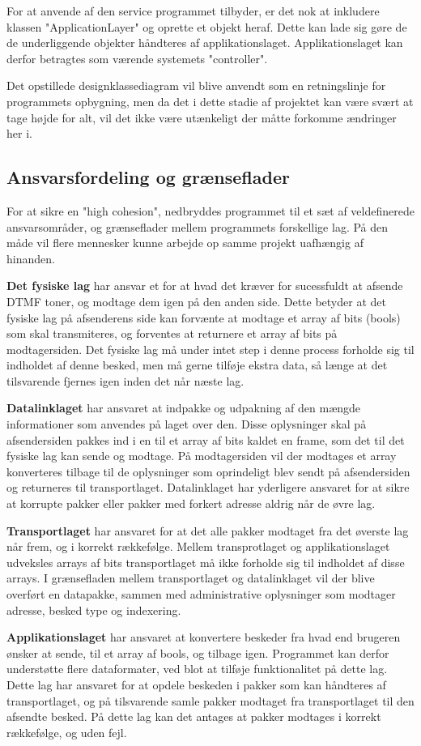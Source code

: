 For at anvende af den service programmet tilbyder, er det nok at inkludere klassen "ApplicationLayer" og oprette et objekt heraf. Dette kan lade sig gøre de de underliggende objekter håndteres af applikationslaget. Applikationslaget kan derfor betragtes som værende systemets "controller". 

Det opstillede designklassediagram vil blive anvendt som en retningslinje for programmets opbygning, men da det i dette stadie af projektet kan være svært at tage højde for alt, vil det ikke være utænkeligt der måtte forkomme ændringer her i.


\subsection{Ansvarsfordeling og grænseflader}
For at sikre en "high cohesion", nedbryddes programmet til et sæt af veldefinerede ansvarsområder, og grænseflader mellem programmets forskellige lag. På den måde vil flere mennesker kunne arbejde op samme projekt uafhængig af hinanden.  

\textbf{Det fysiske lag} har ansvar et for at hvad det kræver for sucessfuldt at afsende DTMF toner, og modtage dem igen på den anden side. Dette betyder at det fysiske lag på afsenderens side kan forvænte at modtage et array af bits (bools) som skal transmiteres, og forventes at returnere et array af bits på modtagersiden. Det fysiske lag må under intet step i denne process forholde sig til indholdet af denne besked, men må gerne tilføje ekstra data, så længe at det tilsvarende fjernes igen inden det når næste lag.

\textbf{Datalinklaget} har ansvaret at indpakke og udpakning af den mængde informationer som anvendes på laget over den. Disse oplysninger skal på afsendersiden pakkes ind i en til et array af bits kaldet en frame, som det til det fysiske lag kan sende og modtage. På modtagersiden vil der modtages et array  konverteres tilbage til de oplysninger som oprindeligt blev sendt på afsendersiden og returneres til transportlaget. 
Datalinklaget har yderligere ansvaret for at sikre at korrupte pakker eller pakker med forkert adresse aldrig når de øvre lag.

\textbf{Transportlaget} har ansvaret for at det alle pakker modtaget fra det øverste lag  når frem, og i korrekt rækkefølge. Mellem transprotlaget og applikationslaget udveksles arrays af bits transportlaget må ikke forholde sig til indholdet af disse arrays. I grænsefladen mellem transportlaget og datalinklaget vil der blive overført en datapakke, sammen med administrative oplysninger som modtager adresse, besked type og indexering. 

\textbf{Applikationslaget} har ansvaret at konvertere beskeder fra hvad end brugeren ønsker at sende, til et array af bools, og tilbage igen. Programmet kan derfor understøtte flere dataformater, ved blot at tilføje funktionalitet på dette lag. 
Dette lag har ansvaret for at opdele beskeden i pakker som kan håndteres af transportlaget, og på tilsvarende samle pakker modtaget fra transportlaget til den afsendte besked. På dette lag kan det antages at pakker modtages i korrekt rækkefølge, og uden fejl. 






